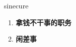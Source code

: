 
\begin{frame}
{\huge sinecure}
\begin{center}
\begin{enumerate}\Large
  \item \textbf{拿钱不干事的职务}
  \item \textbf{闲差事}
\end{enumerate}
\end{center}
\end{frame}
